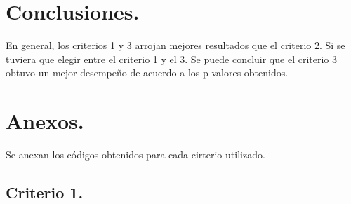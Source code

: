 \documentclass[12pt,3p]{elsarticle}
\begin{document}
\section{Conclusiones.}
En general, los criterios 1 y 3 arrojan mejores resultados que el criterio 2. Si se tuviera que elegir entre el criterio 1 y el 3. Se puede concluir que el criterio 3 obtuvo un mejor desempeño de acuerdo a los p-valores obtenidos.

\section{Anexos.}
Se anexan los códigos obtenidos para cada cirterio utilizado.
\subsection{Criterio 1.}
\end{document}
